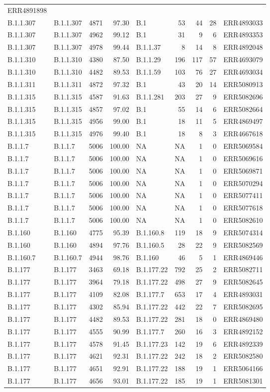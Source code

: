\documentclass[
]{article}
\begin{document}
\begin{longtable}[]{@{}llrrlrrrl@{}}
ERR4891898\tabularnewline
B.1.1.307 & B.1.1.307 & 4871 & 97.30 & B.1 & 53 & 44 & 28 &
ERR4893033\tabularnewline
B.1.1.307 & B.1.1.307 & 4962 & 99.12 & B.1 & 31 & 9 & 6 &
ERR4893353\tabularnewline
B.1.1.307 & B.1.1.307 & 4978 & 99.44 & B.1.1.37 & 8 & 14 & 8 &
ERR4892048\tabularnewline
B.1.1.310 & B.1.1.310 & 4380 & 87.50 & B.1.1.29 & 196 & 117 & 57 &
ERR4693079\tabularnewline
B.1.1.310 & B.1.1.310 & 4482 & 89.53 & B.1.1.59 & 103 & 76 & 27 &
ERR4693034\tabularnewline
B.1.1.311 & B.1.1.311 & 4872 & 97.32 & B.1 & 43 & 20 & 14 &
ERR5080913\tabularnewline
B.1.1.315 & B.1.1.315 & 4587 & 91.63 & B.1.1.281 & 203 & 27 & 9 &
ERR5082696\tabularnewline
B.1.1.315 & B.1.1.315 & 4857 & 97.02 & B.1 & 55 & 14 & 6 &
ERR5082664\tabularnewline
B.1.1.315 & B.1.1.315 & 4956 & 99.00 & B.1 & 18 & 11 & 5 &
ERR4869497\tabularnewline
B.1.1.315 & B.1.1.315 & 4976 & 99.40 & B.1 & 18 & 8 & 3 &
ERR4667618\tabularnewline
B.1.1.7 & B.1.1.7 & 5006 & 100.00 & NA & NA & 1 & 0 &
ERR5069584\tabularnewline
B.1.1.7 & B.1.1.7 & 5006 & 100.00 & NA & NA & 1 & 0 &
ERR5069616\tabularnewline
B.1.1.7 & B.1.1.7 & 5006 & 100.00 & NA & NA & 1 & 0 &
ERR5069871\tabularnewline
B.1.1.7 & B.1.1.7 & 5006 & 100.00 & NA & NA & 1 & 0 &
ERR5070294\tabularnewline
B.1.1.7 & B.1.1.7 & 5006 & 100.00 & NA & NA & 1 & 0 &
ERR5077411\tabularnewline
B.1.1.7 & B.1.1.7 & 5006 & 100.00 & NA & NA & 1 & 0 &
ERR5077618\tabularnewline
B.1.1.7 & B.1.1.7 & 5006 & 100.00 & NA & NA & 1 & 0 &
ERR5082610\tabularnewline
B.1.160 & B.1.160 & 4775 & 95.39 & B.1.160.8 & 119 & 18 & 9 &
ERR5074314\tabularnewline
B.1.160 & B.1.160 & 4894 & 97.76 & B.1.160.5 & 28 & 22 & 9 &
ERR5082569\tabularnewline
B.1.160.7 & B.1.160.7 & 4944 & 98.76 & B.1.160 & 46 & 5 & 1 &
ERR4869446\tabularnewline
B.1.177 & B.1.177 & 3463 & 69.18 & B.1.177.22 & 792 & 25 & 2 &
ERR5082711\tabularnewline
B.1.177 & B.1.177 & 3964 & 79.18 & B.1.177.22 & 498 & 27 & 9 &
ERR5082645\tabularnewline
B.1.177 & B.1.177 & 4109 & 82.08 & B.1.177.7 & 653 & 17 & 4 &
ERR4893031\tabularnewline
B.1.177 & B.1.177 & 4302 & 85.94 & B.1.177.22 & 442 & 22 & 7 &
ERR5082695\tabularnewline
B.1.177 & B.1.177 & 4482 & 89.53 & B.1.177.22 & 281 & 18 & 0 &
ERR4869480\tabularnewline
B.1.177 & B.1.177 & 4555 & 90.99 & B.1.177.7 & 260 & 16 & 3 &
ERR4892152\tabularnewline
B.1.177 & B.1.177 & 4578 & 91.45 & B.1.177.23 & 142 & 19 & 6 &
ERR4892339\tabularnewline
B.1.177 & B.1.177 & 4621 & 92.31 & B.1.177.22 & 242 & 18 & 2 &
ERR5082580\tabularnewline
B.1.177 & B.1.177 & 4651 & 92.91 & B.1.177.22 & 188 & 19 & 1 &
ERR5064166\tabularnewline
B.1.177 & B.1.177 & 4656 & 93.01 & B.1.177.22 & 185 & 19 & 1 &
ERR5081301\tabularnewline

\end{longtable}
\end{document}
